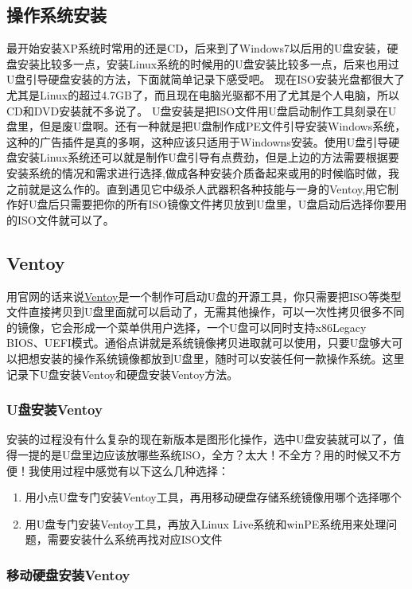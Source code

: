 \subsection{操作系统安装}
最开始安装XP系统时常用的还是CD，后来到了Windows7以后用的U盘安装，硬盘安装比较多一点，安装Linux系统的时候用的U盘安装比较多一点，后来也用过U盘引导硬盘安装的方法，下面就简单记录下感受吧。
现在ISO安装光盘都很大了尤其是Linux的超过4.7GB了，而且现在电脑光驱都不用了尤其是个人电脑，所以CD和DVD安装就不多说了。
U盘安装是把ISO文件用U盘启动制作工具刻录在U盘里，但是废U盘啊。还有一种就是把U盘制作成PE文件引导安装Windows系统，这种的广告插件是真的多啊，这种应该只适用于Windowns安装。使用U盘引导硬盘安装Linux系统还可以就是制作U盘引导有点费劲，但是上边的方法需要根据要安装系统的情况和需求进行选择,做成各种安装介质备起来或用的时候临时做，我之前就是这么作的。直到遇见它中级杀人武器积各种技能与一身的Ventoy,用它制作好U盘后只需要把你的所有ISO镜像文件拷贝放到U盘里，U盘启动后选择你要用的ISO文件就可以了。
\subsection{Ventoy}

用官网的话来说\href{https://www.ventoy.net/cn/index.html}{Ventoy}是一个制作可启动U盘的开源工具，你只需要把ISO等类型文件直接拷贝到U盘里面就可以启动了，无需其他操作，可以一次性拷贝很多不同的镜像，它会形成一个菜单供用户选择，一个U盘可以同时支持x86Legacy BIOS、UEFI模式。通俗点讲就是系统镜像拷贝进取就可以使用，只要U盘够大可以把想安装的操作系统镜像都放到U盘里，随时可以安装任何一款操作系统。这里记录下U盘安装Ventoy和硬盘安装Ventoy方法。
\subsubsection{U盘安装Ventoy}
安装的过程没有什么复杂的现在新版本是图形化操作，选中U盘安装就可以了，值得一提的是U盘里边应该放哪些系统ISO，全方？太大！不全方？用的时候又不方便！我使用过程中感觉有以下这么几种选择：
\begin{enumerate}
	\item 用小点U盘专门安装Ventoy工具，再用移动硬盘存储系统镜像用哪个选择哪个
	\item 用U盘专门安装Ventoy工具，再放入Linux Live系统和winPE系统用来处理问题，需要安装什么系统再找对应ISO文件
\end{enumerate}

\subsubsection{移动硬盘安装Ventoy}

